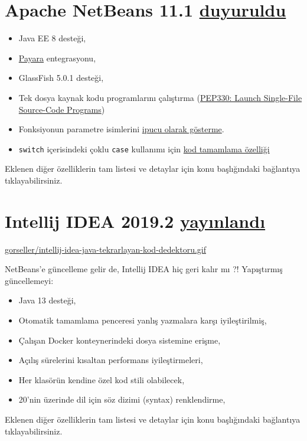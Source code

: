 \documentclass[11pt]{article}
\begin{document}
\section{Apache NetBeans 11.1 \href{https://netbeans.apache.org/download/nb111/index.html}{duyuruldu}}
\label{sec:org20a40f4}
\begin{itemize}
\item Java EE 8 desteği,
\item \href{https://www.payara.fish/}{Payara} entegrasyonu,
\item GlassFish 5.0.1 desteği,
\item Tek dosya kaynak kodu programlarını çalıştırma (\href{https://openjdk.java.net/jeps/330}{PEP330: Launch Single-File
Source-Code Programs})
\item Fonksiyonun parametre isimlerini \href{https://github.com/apache/netbeans/pull/1247}{ipucu olarak gösterme}.
\item \texttt{switch} içerisindeki çoklu \texttt{case} kullanımı için \href{https://github.com/apache/netbeans/pull/1175}{kod tamamlama özelliği}
\end{itemize}

Eklenen diğer özelliklerin tam listesi ve detaylar için konu başlığındaki
bağlantıya tıklayabilirsiniz.
\section{Intellij IDEA 2019.2 \href{https://www.jetbrains.com/idea/whatsnew/\#v2019-2}{yayınlandı}}
\label{sec:orgbe52eaf}
\url{gorseller/intellij-idea-java-tekrarlayan-kod-dedektoru.gif}

NetBeans'e güncelleme gelir de, Intellij IDEA hiç geri kalır mı ?! Yapıştırmış
güncellemeyi:
\begin{itemize}
\item Java 13 desteği,
\item Otomatik tamamlama penceresi yanlış yazmalara karşı iyileştirilmiş,
\item Çalışan Docker konteynerindeki dosya sistemine erişme,
\item Açılış sürelerini kısaltan performans iyileştirmeleri,
\item Her klasörün kendine özel kod stili olabilecek,
\item 20'nin üzerinde dil için söz dizimi (syntax) renklendirme,
\end{itemize}

Eklenen diğer özelliklerin tam listesi ve detaylar için konu başlığındaki
bağlantıya tıklayabilirsiniz.
\end{document}
